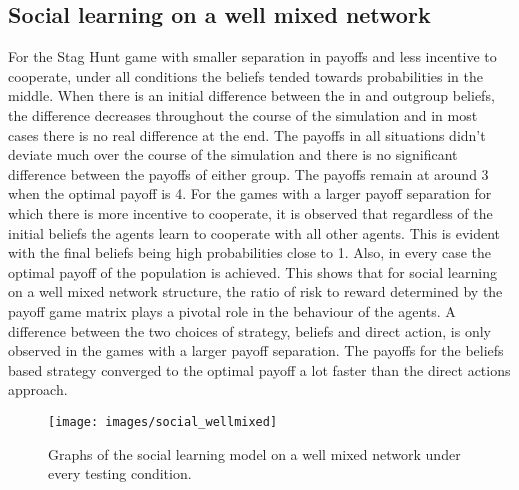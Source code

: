 \documentclass[]{llncs}
\begin{document}
\subsection{Social learning on a well mixed network}
For the Stag Hunt game with smaller separation in payoffs and less incentive to cooperate, under all conditions the beliefs tended towards probabilities in the middle. When there is an initial difference between the in and outgroup beliefs, the difference decreases throughout the course of the simulation and in most cases there is no real difference at the end. The payoffs in all situations didn’t deviate much over the course of the simulation and there is no significant difference between the payoffs of either group. The payoffs remain at around 3 when the optimal payoff is 4.
For the games with a larger payoff separation for which there is more incentive to cooperate, it is observed that regardless of the initial beliefs the agents learn to cooperate with all other agents. This is evident with the final beliefs being high probabilities close to 1. Also, in every case the optimal payoff of the population is achieved. This shows that for social learning on a well mixed network structure, the ratio of risk to reward determined by the payoff game matrix plays a pivotal role in the behaviour of the agents. A difference between the two choices of strategy, beliefs and direct action, is only observed in the games with a larger payoff separation. The payoffs for the beliefs based strategy converged to the optimal payoff a lot faster than the direct actions approach. 

\begin{figure}
\centering
\texttt{[image: images/social\_wellmixed]}
\caption{\label{social_wellmixed} Graphs of the social learning model on a well mixed network under every testing condition.}
\end{figure}
\end{document}
